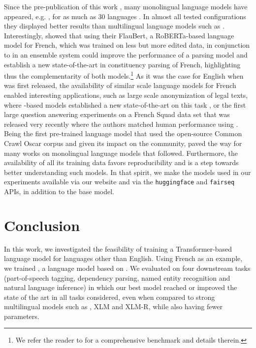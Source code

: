 Since the pre-publication of this work \cite{martin-etal-2020-camembert},
many monolingual language models have appeared, e.g.
\cite{le-etal-2020-flaubert-unsupervised,virtanen-etal-2019-multilingual,delobelle-etal-2020-robbert}, for as much as 30
languages \cite{nozza-etal-2020-what}. In almost all tested
configurations they displayed better results than multilingual
language models such as \mbert \cite{pires-etal-2019-multilingual}.
Interestingly,  showed that using their
FlauBert, a RoBERTa-based language model for French, which was trained on less
but more edited data, in conjunction to \camembert in an ensemble
system could improve the performance of a parsing model and  establish
a new state-of-the-art in constituency parsing of French, highlighting thus
the complementarity of both models.\footnote{We refer the reader to
    \cite{le-etal-2020-flaubert-unsupervised} for a comprehensive benchmark and details
    therein.}
As it was the case for English when \bert was first released, the
availability of similar scale language models for French enabled
interesting applications, such as large scale anonymization of legal
texts, where \camembert-based models established a new
state-of-the-art on this task \cite{benesty-2019-ner}, or the first
large question answering experiments on a French Squad data set that
was released very recently \cite{dhoffschmidt-etal-2020-fquad} where the authors matched human performance using \camembertlarge.
Being the first pre-trained language model that used the open-source Common Crawl Oscar
corpus and given its impact on the community,
\camembert paved the way for many works on monolingual language
models that followed. Furthermore, the availability of all its
training data favors reproducibility and is a step towards better
understanding such models.
In that spirit, we make the models used in our experiments available via our website and via the \texttt{huggingface} and \texttt{fairseq} APIs, in addition to the base \camembert model.

\section{Conclusion}
In this work, we investigated the feasibility of training a
Transformer-based language model for languages other than English.
Using French as an example, we trained \camembert, a language model
based on \roberta.
We evaluated \camembert on four downstream tasks
(part-of-speech tagging, dependency parsing, named entity recognition
and natural language inference) in which our best model reached or improved the state of the art in all tasks
considered, even when compared to strong multilingual models such as
\mbert, XLM and XLM-R, while also having fewer parameters.

